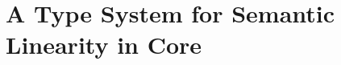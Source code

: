\documentclass[acmsmall,review,anonymous,screen]{acmart}
\begin{document}
  

\section{A Type System for Semantic Linearity in Core\label{sec:main:linear-core}}
\end{document}
